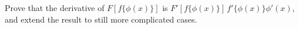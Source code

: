 Prove that the derivative of $F[f\{\phi(x)\}]$ is $F'[f\{\phi(x)\}]\, f'\{\phi(x)\}\phi'(x)$,
and extend the result to still more complicated cases.


